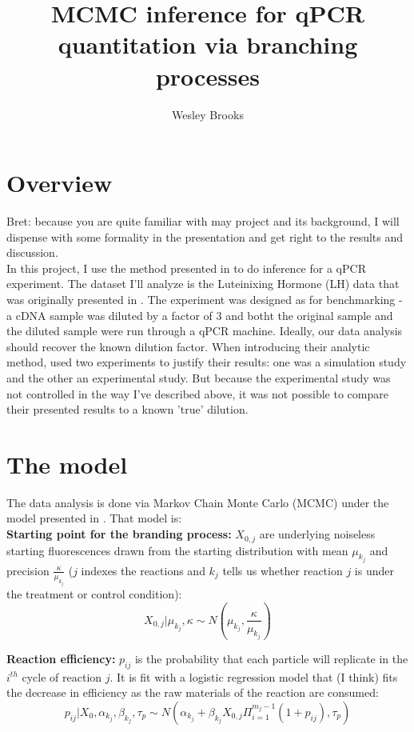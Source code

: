 \documentclass[12pt]{article}
\title{MCMC inference for qPCR quantitation via branching processes}
\author{Wesley Brooks}
\date{}                                           %
\begin{document}
\maketitle

    
\section{Overview}
Bret: because you are quite familiar with may project and its background, I will dispense with some formality in the presentation and get right to the results and discussion.\\

In this project, I use the method presented in \cite{norway:2010} to do inference for a qPCR experiment. The dataset I'll analyze is the Luteinixing Hormone (LH) data that was originally presented in \cite{hanlon:2012}. The experiment was designed as for benchmarking - a cDNA sample was diluted by a factor of 3 and botht the original sample and the diluted sample were run through a qPCR machine. Ideally, our data analysis should recover the known dilution factor. When introducing their analytic method, \cite{norway:2010} used two experiments to justify their results: one was a simulation study and the other an experimental study. But because the experimental study was not controlled in the way I've described above, it was not possible to compare their presented results to a known 'true' dilution.\\


\section{The model}
The data analysis is done via Markov Chain Monte Carlo (MCMC) under the model presented in \cite{norway:2010}. That model is:\\

\textbf{Starting point for the branding process:} $X_{0,j}$ are underlying noiseless starting fluorescences drawn from the starting distribution with mean $\mu_{k_j}$ and precision $\frac{\kappa}{\mu_{k_j}}$ ($j$ indexes the reactions and $k_j$ tells us whether reaction $j$ is under the treatment or control condition):
\[
    X_{0,j}|\mu_{k_j} , \kappa \sim N(\mu_{k_j}, \frac{\kappa}{\mu_{k_j}})
\]


\textbf{Reaction efficiency:} $p_{ij}$ is the probability that each particle will replicate in the $i^{th}$ cycle of reaction $j$. It is fit with a logistic regression model that (I think) fits the decrease in efficiency as the raw materials of the reaction are consumed:
\[
    p_{ij}|X_0 , \alpha_{k_j}, \beta_{k_j}, \tau_p \sim N(\alpha_{k_j} + \beta_{k_j} X_{0,j}\Pi_{i=1}^{m_j-1} (1+p_{ij}), \tau_p)
\]
\end{document}
